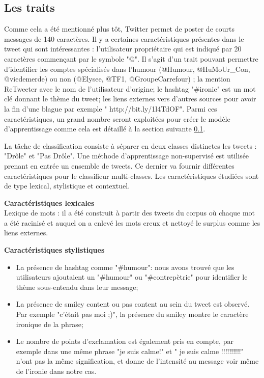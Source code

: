 \documentclass[10pt,a4paper,twoside]{article}
\begin{document}
\subsection{Les traits}
\label{features}
Comme cela a été mentionné plus tôt, Twitter permet de poster de courts messages de 140 caractères. Il y a certaines caractéristiques présentes dans le tweet qui sont intéressantes : l'utilisateur propriétaire qui est indiqué par 20 caractères commençant par le symbole "@". Il s'agit d'un trait pouvant permettre d'identifier les comptes spécialisés dans l'humour (@Humour, @HuMoUr\_Con, @viedemerde) ou non (@Elysee, @TF1, @GroupeCarrefour) ; la mention ReTweeter avec le nom de l'utilisateur d'origine; le hashtag "\#ironie" est un mot clé donnant le thème du tweet; les liens externes vers d'autres sources pour avoir la fin d'une blague par exemple " http://bit.ly/1l4TdOF". Parmi ces caractéristiques, un grand nombre seront exploitées pour créer le modèle d'apprentissage comme cela est détaillé à la section suivante \ref{features}.


La tâche de classification consiste à séparer en deux classes distinctes les tweets : "Drôle" et "Pas Drôle".
Une méthode d'apprentissage non-supervisé est utilisée prenant en entrée un ensemble de tweets. Ce dernier va fournir différentes caractéristiques pour le classifieur multi-classes. Les caractéristiques étudiées sont de type lexical, stylistique et contextuel. 

\textbf{Caractéristiques lexicales}\\
Lexique de mots : il a été construit à partir des tweets du corpus où chaque mot a été racinisé et auquel on a enlevé les mots creux et nettoyé le surplus comme les liens externes.
\vspace{0.5cm}

\textbf{Caractéristiques stylistiques}
\begin{itemize}
\item La présence de hashtag comme "\#humour": nous avons trouvé que les utilisateurs ajoutaient un "\#humour" ou "\#contrepètrie" pour identifier le thème sous-entendu dans leur message;
\item La présence de smiley content ou pas content au sein du tweet est observé. Par exemple "c'était pas moi ;)", la présence du smiley montre le caractère ironique de la phrase;
\item Le nombre de points d'exclamation est également pris en compte, par exemple dans une même phrase "je suis calme!" et " je suis calme !!!!!!!!!!" n'ont pas la même signification, et donne de l'intensité au message voir même de l'ironie dans notre cas. 
\end{itemize}
\vspace{1.7cm}
\end{document}

